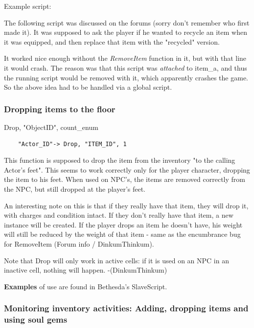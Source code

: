 Example script:

The following script was discussed on the forums (sorry don't remember
who first made it). It was supposed to ask the player if he wanted to
recycle an item when it was equipped, and then replace that item with
the "recycled" version.



It worked nice enough without the \emph{RemoveItem} function in it, but
with that line it would crash. The reason was that this script was
\emph{attached} to item\_a, and thus the running script would be removed
with it, which apparently crashes the game. So the above idea had to be
handled via a global script.

\hypertarget{dropping-items-to-the-floor}{%
\subsubsection{Dropping items to the
floor}\label{dropping-items-to-the-floor}}

	Drop, "ObjectID", count\_enum

\begin{lstlisting}	
	"Actor_ID"-> Drop, "ITEM_ID", 1
\end{lstlisting}

This function is supposed to drop the item from the inventory "to the
calling Actor's feet". This seems to work correctly only for the player
character, dropping the item to his feet. When used on NPC's, the items
are removed correctly from the NPC, but still dropped at the player's
feet.

An interesting note on this is that if they really have that item, they
will drop it, with charges and condition intact. If they don't really
have that item, a new instance will be created. If the player drops an
item he doesn't have, his weight will still be reduced by the weight of
that item - same as the encumbrance bug for RemoveItem (Forum info /
DinkumThinkum).

Note that Drop will only work in active cells: if it is used on an NPC
in an inactive cell, nothing will happen. -(DinkumThinkum)

\textbf{Examples} of use are found in Bethesda's SlaveScript.

\hypertarget{monitoring-inventory-activities-adding-dropping-items-and-using-soul-gems}{%
\subsubsection{Monitoring inventory activities: Adding, dropping items
and using soul
gems}\label{monitoring-inventory-activities-adding-dropping-items-and-using-soul-gems}}

